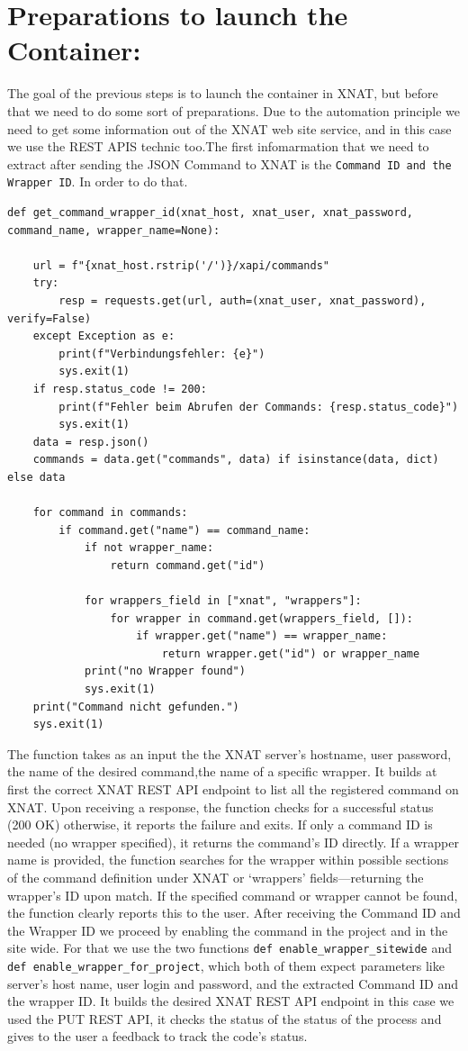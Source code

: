 \section{Preparations to launch the Container:}
The goal of the previous steps is to launch the container in XNAT, but before that we need to do some sort of preparations. Due to the automation principle we need to get some information out of the XNAT web site service, and in this case we use the REST APIS technic too.The first infomarmation that we need to extract after sending the JSON Command to XNAT is the \texttt{Command ID and the Wrapper ID}.
In order to do that. 
 
\begin{lstlisting}
def get_command_wrapper_id(xnat_host, xnat_user, xnat_password, command_name, wrapper_name=None):
 
    url = f"{xnat_host.rstrip('/')}/xapi/commands"
    try:
        resp = requests.get(url, auth=(xnat_user, xnat_password), verify=False)
    except Exception as e:
        print(f"Verbindungsfehler: {e}")
        sys.exit(1)
    if resp.status_code != 200:
        print(f"Fehler beim Abrufen der Commands: {resp.status_code}")
        sys.exit(1)
    data = resp.json()
    commands = data.get("commands", data) if isinstance(data, dict) else data

    for command in commands:
        if command.get("name") == command_name:
            if not wrapper_name:
                return command.get("id")
            
            for wrappers_field in ["xnat", "wrappers"]:
                for wrapper in command.get(wrappers_field, []):
                    if wrapper.get("name") == wrapper_name:
                        return wrapper.get("id") or wrapper_name
            print("no Wrapper found")
            sys.exit(1)
    print("Command nicht gefunden.")
    sys.exit(1)
\end{lstlisting}
The function takes as an input the the XNAT server’s hostname, user password, the name of the desired command,the name of a specific wrapper. It builds at first the correct XNAT REST API endpoint to list all the registered command on XNAT.
Upon receiving a response, the function checks for a successful status (200 OK) otherwise, it reports the failure and exits. If only a command ID is needed (no wrapper specified), it returns the command’s ID directly. If a wrapper name is provided, the function searches for the wrapper within possible sections of the command definition under XNAT or ‘wrappers’ fields—returning the wrapper’s ID upon match. If the specified command or wrapper cannot be found, the function clearly reports this to the user.
After receiving the Command ID and the Wrapper ID we proceed by enabling the command in the project and in the site wide. For that we use the two functions \texttt{def enable\_wrapper\_sitewide} and \texttt{ def enable\_wrapper\_for\_project}, which both of them expect parameters like server’s host name, user login and  password, and the extracted Command ID and the wrapper ID. It builds the desired XNAT REST API endpoint in this case we used the PUT REST API, it checks the status of the status of the process and gives to the user a feedback to track the code's status.

